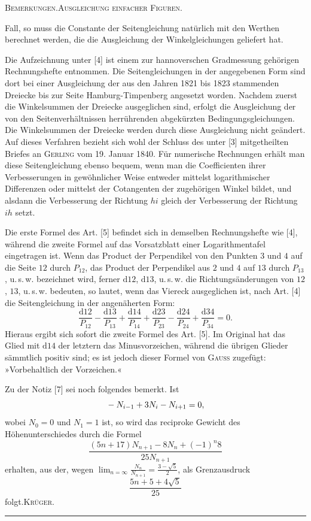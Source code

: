 \clearpage
{}\hfill\textsc{Bemerkungen.\quad Ausgleichung einfacher Figuren.}\hfill\mbox{}\par\medskip
\begingroup\footnotesize
\noindent Fall, so muss die Constante der Seitengleichung natürlich mit den Werthen berechnet werden, die die Ausgleichung der Winkelgleichungen geliefert hat.

Die Aufzeichnung unter [4] ist einem zur hannoverschen Gradmessung gehörigen Rechnungshefte entnommen. Die Seitengleichungen in der angegebenen Form sind dort bei einer Ausgleichung der aus den Jahren 1821 bis 1823 stammenden Dreiecke bis zur Seite Hamburg-Timpenberg angesetzt worden. Nachdem zuerst die Winkelsummen der Dreiecke ausgeglichen sind, erfolgt die Ausgleichung der von den Seitenverhältnissen herrührenden abgekürzten Bedingungsgleichungen. Die Winkelsummen der Dreiecke werden durch diese Ausgleichung nicht geändert. Auf dieses Verfahren bezieht sich wohl der Schluss des unter [3] mitgetheilten Briefes an \textsc{Gerling} vom 19. Januar 1840. Für numerische Rechnungen erhält man diese Seitengleichung ebenso bequem, wenn man die Coefficienten ihrer Verbesserungen in gewöhnlicher Weise entweder mittelst logarithmischer Differenzen oder mittelst der Cotangenten der zugehörigen Winkel bildet, und alsdann die Verbesserung der Richtung $hi$ gleich der Verbesserung der Richtung $ih$ setzt.

Die erste Formel des Art. [5] befindet sich in demselben Rechnungshefte wie [4], während die zweite Formel auf das Vorsatzblatt einer Logarithmentafel eingetragen ist. Wenn das Product der Perpendikel von den Punkten $3$ und $4$ auf die Seite $12$ durch $P_{12}$, das Product der Perpendikel aus $2$ und $4$ auf $13$ durch $P_{13}$, u.\,s.\,w. bezeichnet wird, ferner $\mathrm d12$, $\mathrm d13$, u.\,s.\,w. die Richtungsänderungen von $12$, $13$, u.\,s.\,w. bedeuten, so lautet, wenn das Viereck ausgeglichen ist, nach Art. [4] die Seitengleichung in der angenäherten Form:
\[
\frac{\mathrm d12}{P_{12}}-\frac{\mathrm d13}{P_{13}}+\frac{\mathrm d14}{P_{14}}+\frac{\mathrm d23}{P_{23}}-\frac{\mathrm d24}{P_{24}}+\frac{\mathrm d34}{P_{34}}=0.
\]
Hieraus ergibt sich sofort die zweite Formel des Art. [5]. Im Original hat das Glied mit $\mathrm d14$ der letztern das Minusvorzeichen, während die übrigen Glieder sämmtlich positiv sind; es ist jedoch dieser Formel von \textsc{Gauss} zugefügt: »Vorbehaltlich der Vorzeichen.«

Zu der Notiz [7] sei noch folgendes bemerkt. Ist
\[
\llap{\raisebox{1ex}{\text{\tiny.}}\hspace{4cm}}-N_{i-1}+3N_i-N_{i+1}=0,
\]
\noindent wobei $N_0=0$ und $N_1=1$ ist, so wird das reciproke Gewicht des Höhenunterschiedes durch die Formel
\[
\frac{(5n+17)N_{n+1}-8N_n+(-1)^n8}{25N_{n+1}}
\]
\noindent erhalten, aus der, wegen $\displaystyle\lim_{n=\infty}\frac{N_n}{N_{n+1}}=\frac{3-\sqrt5}{2}$, als Grenzausdruck
\[
\frac{5n+5+4\sqrt5}{25}
\]
\noindent folgt.\hfill\textsc{Krüger.}\par
\endgroup
\vspace{1.6cm}
\begin{center}\rule{4cm}{.4pt}\end{center}

